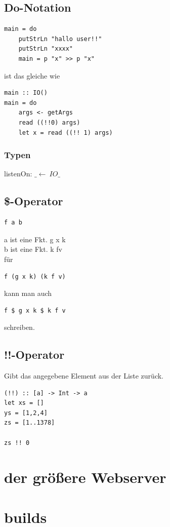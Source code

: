 \documentclass[ngerman,a4paper]{report}
\begin{document}
\subsection{Do-Notation}
\begin{lstlisting}
main = do
	putStrLn "hallo user!!"
	putStrLn "xxxx"
	main = p "x" >> p "x"
\end{lstlisting}

ist das gleiche wie
\begin{lstlisting}
main :: IO()
main = do
	args <- getArgs
	read ((!!0) args)
	let x = read ((!! 1) args)
\end{lstlisting}

\subsubsection{Typen}

listenOn: $\_ \leftarrow \ IO\_$

\subsection{\$-Operator}
\begin{lstlisting}
f a b
\end{lstlisting}
a ist eine Fkt. g x k\\
b ist eine Fkt. k fv\\
für
\begin{lstlisting}
f (g x k) (k f v)
\end{lstlisting}
kann man auch 
\begin{lstlisting}
f $ g x k $ k f v
\end{lstlisting}
schreiben.\\
\subsection{!!-Operator}
Gibt das angegebene Element aus der Liste zurück.
\begin{lstlisting}
(!!) :: [a] -> Int -> a
let xs = []
ys = [1,2,4]
zs = [1..1378]

zs !! 0
\end{lstlisting}
\section{der größere Webserver}

\section{builds}
\end{document}
